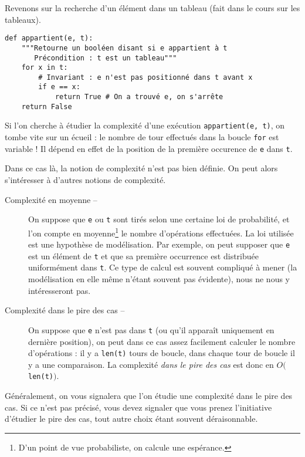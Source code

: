 Revenons sur la recherche d'un élément dans un tableau (fait dans le cours sur les tableaux). 

\begin{lstlisting}
def appartient(e, t):
    """Retourne un booléen disant si e appartient à t
       Précondition : t est un tableau"""
    for x in t:
        # Invariant : e n'est pas positionné dans t avant x
        if e == x:
            return True # On a trouvé e, on s'arrête
    return False
\end{lstlisting}

Si l'on cherche à étudier la complexité d'une exécution \lstinline{appartient(e, t)}, on tombe vite sur un écueil : le nombre de tour effectués dans la boucle \lstinline{for} est variable ! 
Il dépend en effet de la position de la première occurence de \lstinline{e} dans \lstinline{t}. 

Dans ce cas là, la notion de complexité n'est pas bien définie. On peut alors s'intéresser à d'autres notions de complexité. 

\begin{description}
  \item[Complexité en moyenne --] On suppose que \lstinline{e} ou \lstinline{t} sont tirés selon une certaine loi 
de probabilité, et l'on compte \og en moyenne\footnote{D'un point de vue probabiliste, on calcule une 
espérance.} \fg{} le nombre d'opérations effectuées. 
    La loi utilisée est une hypothèse de modélisation. Par exemple, on peut supposer que \lstinline{e} est un élément de \lstinline{t} et que sa première occurrence est distribuée uniformément dans \lstinline{t}. 
    Ce type de calcul est souvent compliqué à mener (la modélisation en elle même n'étant souvent pas évidente), nous ne nous y intéresseront pas. 
  \item[Complexité dans le pire des cas --] On suppose que \lstinline{e} n'est pas dans \lstinline{t} (ou qu'il apparaît uniquement en dernière position), on peut dans ce cas assez facilement calculer le nombre d'opérations : 
    il y a \lstinline{len(t)} tours de boucle, dans chaque tour de boucle il y a une comparaison. La complexité \emph{dans le pire des cas} est donc en $O($\lstinline{len(t)}$)$.
\end{description}

Généralement, on vous signalera que l'on étudie une complexité dans le pire des cas. Si ce n'est pas précisé, vous devez signaler que vous prenez l'initiative d'étudier le pire des cas, tout autre choix étant souvent déraisonnable. 

